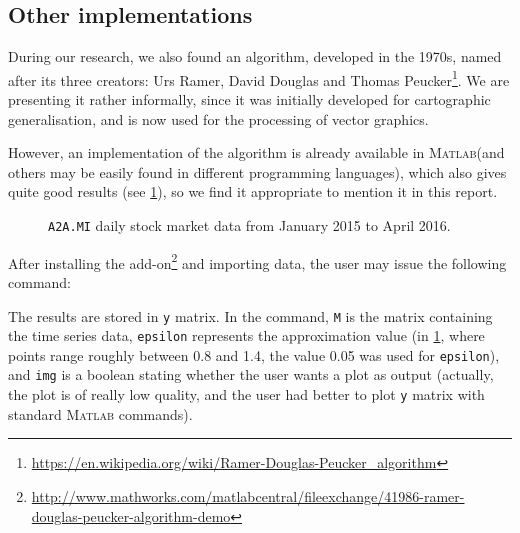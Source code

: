 \documentclass[a4paper]{article}
\newcommand{\matlab}{\textsc{Matlab}\xspace}
\begin{document}
\subsection{Other implementations}\label{sec:other}

During our research, we also found an algorithm, developed in the 1970s, named after its three creators: Urs Ramer, David Douglas and Thomas Peucker\footnote{\url{https://en.wikipedia.org/wiki/Ramer-Douglas-Peucker_algorithm}}. We are presenting it rather informally, since it was initially developed for cartographic generalisation, and is now used for the processing of vector graphics.

However, an implementation of the algorithm is already available in \matlab (and others may be easily found in different programming languages), which also gives quite good results (see \cref{fig:rdp}), so we find it appropriate to mention it in this report. 

\begin{figure}[H]
	
	
	\caption{\texttt{A2A.MI} daily stock market data from January 2015 to April 2016.}\label{fig:rdp}

\end{figure}

After installing the add-on\footnote{\url{http://www.mathworks.com/matlabcentral/fileexchange/41986-ramer-douglas-peucker-algorithm-demo}} and importing data, the user may issue the following command: 

The results are stored in \texttt{y} matrix. In the command, \texttt{M} is the matrix containing the time series data, \texttt{epsilon} represents the approximation value (in \cref{fig:rdp}, where points range roughly between 0.8 and 1.4, the value 0.05 was used for \texttt{epsilon}), and \texttt{img} is a boolean stating whether the user wants a plot as output (actually, the plot is of really low quality, and the user had better to plot \texttt{y} matrix with standard \matlab commands). 
 
 










\clearpage
{}
\printbibliography[title={Bibliography}, prenote=prenote] 
\end{document}
